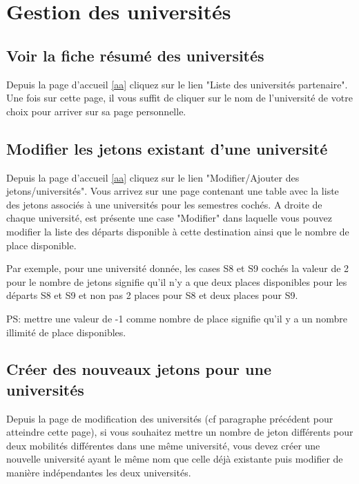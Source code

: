 \section{Gestion des universités}

\subsection{Voir la fiche résumé des universités}

Depuis la page d'accueil \ref{aa} cliquez sur le lien "Liste des universités partenaire". Une fois sur cette page, il vous suffit de cliquer sur le nom de l'université de votre choix pour arriver sur sa page personnelle.
 
\subsection{Modifier les jetons existant d'une université}
\label{mj}
Depuis la page d'accueil \ref{aa} cliquez sur le lien "Modifier/Ajouter des jetons/universités". Vous arrivez sur une page contenant une table avec la liste des jetons associés à une universités pour les semestres cochés. A droite de chaque université, est présente une case "Modifier" dans laquelle vous pouvez modifier la liste des départs disponible à cette destination ainsi que le nombre de place disponible.

\smallbreak

Par exemple, pour une université donnée, les cases S8 et S9 cochés la valeur de 2 pour le nombre de jetons signifie qu'il n'y a que deux places disponibles pour les départs S8 et S9 et non pas 2 places pour S8 et deux places pour S9.

\smallbreak

PS: mettre une valeur de -1 comme nombre de place signifie qu'il y a un nombre illimité de place disponibles.

\subsection{Créer des nouveaux jetons pour une universités}
\label{cj}

Depuis la page de modification des universités (cf paragraphe précédent pour atteindre cette page), si vous souhaitez mettre un nombre de jeton différents pour deux mobilités différentes dans une même université, vous devez créer une nouvelle université ayant le même nom que celle déjà existante puis modifier de manière indépendantes les deux universités.

